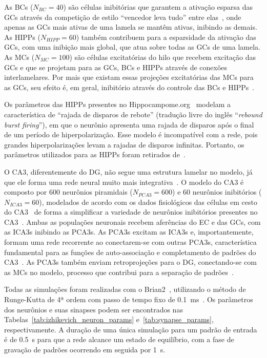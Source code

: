As BCs ($N_{BC} = 40$) são células inibitórias que garantem a ativação esparsa das GCs através da competição de estilo ``vencedor
leva tudo'' entre elas~\cite{coultripCortical1992,chavlisDendrites2017,kimAdult2024}, onde apenas as GCs mais ativas de uma lamela
se mantêm ativas, inibindo as demais. As HIPPs ($N_{HIPP} = 60$) também contribuem para a esparsidade da ativação das GCs, com uma
inibição mais global, que atua sobre todas as GCs de uma lamela. As MCs ($N_{MC} = 100$) são células excitatórias do hilo que
recebem excitação das GCs e que se projetam para as GCs, BCs e HIPPs através de conexões interlamelares. Por mais que existam
essas projeções excitatórias das MCs para as GCs, seu efeito é, em geral, inibitório através do controle das BCs e
HIPPs~\cite{myersRole2009,scharfmanHilar2013}.

Os parâmetros das HIPPs presentes no Hippocampome.org~\cite{wheelerHippocampomeorg2023} modelam a característica de ``rajada de
disparos de rebote'' (tradução livre do inglês ``\textit{rebound burst firing}''), em que o neurônio apresenta uma rajada de
disparos após o final de um período de hiperpolarização. Esse modelo é incompatível com a rede, pois grandes hiperpolarizações
levam a rajadas de disparos infinitas. Portanto, os parâmetros utilizados para as HIPPs foram retirados
de~.

O CA3, diferentemente do DG, não segue uma estrutura lamelar no modelo, já que ele forma uma rede neural muito mais
integrativa~\cite{pakHippocampal2022, watsonHuman2025}. O modelo do CA3 é composto por 600 neurônios piramidais ($N_{PCA3} = 600$)
e 60 neurônios inibitórios ($N_{ICA3} = 60$), modelados de acordo com os dados fisiológicos das células em cesto do
CA3~\cite{wheelerHippocampomeorg2023} de forma a simplificar a variedade de neurônios inibitórios presentes no
CA3~\cite{kopsickFormation2024}. Ambas as populações neuronais recebem aferências do EC e das GCs, com as ICA3s inibindo as PCA3s.
As PCA3s excitam as ICA3s e, importantemente, formam uma rede recorrente ao conectarem-se com outras PCA3s, característica
fundamental para as funções de auto-associação e completamento de padrões do CA3~\cite{kopsickFormation2024, rollsMechanisms2013}.
As PCA3s também enviam retroprojeções para o DG, conectando-se com as MCs no modelo, processo que contribui para a separação de
padrões~\cite{myersPattern2011}.

Todas as simulações foram realizadas com o Brian2~\cite{stimbergBrian2019a}, utilizando o método de Runge-Kutta de 4ª ordem com
passo de tempo fixo de \SI{0.1}{\milli\second}~\cite{butcherHistory1996}. Os parâmetros dos neurônios e suas sinapses podem ser
encontrados nas Tabelas~\ref{tab:izhikevich_neuron_params} e~\ref{tab:synapse_params}, respectivamente. A duração de uma única
simulação para um padrão de entrada é de \SI{0.5}{\second} para que a rede alcance um estado de equilíbrio, com a fase de
gravação de padrões ocorrendo em seguida por \SI{1}{\second}.


